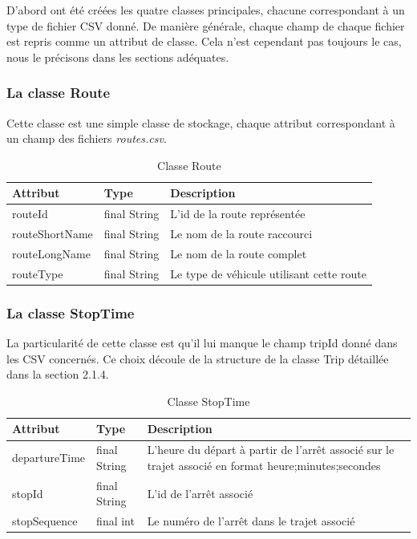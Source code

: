 \documentclass[12pt,openany]{article}
\begin{document}
D'abord ont été créées les quatre classes principales, chacune correspondant à un type de fichier CSV donné. De manière générale, 
chaque champ de chaque fichier est repris comme un attribut de classe. Cela n'est cependant pas toujours le cas, nous le précisons
dans les sections adéquates.

\subsubsection{La classe Route}
Cette classe est une simple classe de stockage, chaque attribut correspondant à un champ des fichiers \emph{routes.csv}.

\begin{table}[h]
    \centering
    \begin{tabular}{|l|l|p{8cm}|}
    \hline
    \textbf{Attribut} & \textbf{Type} & \textbf{Description} \\
    \hline
    routeId & final String & L'id de la route représentée \\
    routeShortName & final String & Le nom de la route raccourci \\
    routeLongName & final String & Le nom de la route complet \\
    routeType & final String & Le type de véhicule utilisant cette route \\
    \hline
    \end{tabular}
    \caption{Classe Route}
\end{table}

\subsubsection{La classe StopTime}
La particularité de cette classe est qu'il lui manque le champ tripId donné dans les CSV concernés. Ce choix découle
de la structure de la classe Trip détaillée dans la section 2.1.4. %
\vspace{2cm}
\begin{table}[h]
    \centering
    \begin{tabular}{|l|l|p{8cm}|}
    \hline
    \textbf{Attribut} & \textbf{Type} & \textbf{Description} \\
    \hline
    departureTime & final String & L'heure du départ à partir de
                                   l'arrêt associé sur le trajet associé en format 
                                   heure;minutes;secondes \\
    stopId & final String & L'id de l'arrêt associé \\
    stopSequence & final int & Le numéro de l'arrêt dans le trajet associé \\
    \hline
    \end{tabular}
    \caption{Classe StopTime}
\end{table}
\end{document}
